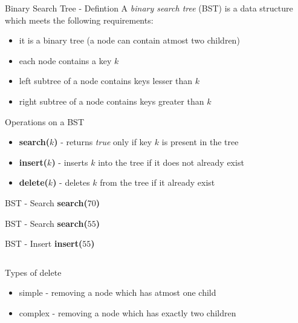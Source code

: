 \begin{frame}{Binary Search Tree - Defintion}
A \textit{binary search tree} (BST) is a data structure which meets the following requirements:
\begin{itemize}
\item it  is a binary tree (a node can contain atmost two children)
\item each node contains a key $k$
\item left subtree of a node contains keys lesser than $k$
\item right subtree of a node contains keys greater than $k$
\end{itemize}
\pause
Operations on a BST
\begin{itemize}
\item \textbf{search($k$)} - returns \textit{true} only if key $k$ is present in the tree
\item \textbf{insert($k$)} - inserts $k$ into the tree if it does not already exist
\item \textbf{delete($k$)} - deletes $k$ from the tree if it already exist
\end{itemize}
\end{frame}

\begin{frame}{BST - Search}
\textbf{search($70$)}\\

\end{frame}

\begin{frame}{BST - Search}
\textbf{search($55$)}\\

\end{frame}

\begin{frame}{BST - Insert}
\textbf{insert($55$)}\\
\begin{columns}
\begin{column}[t]{0.48\textwidth}

\end{column}
\pause
\pause
\begin{column}[t]{0.5\textwidth}

\end{column}
\end{columns}
\end{frame}

\begin{frame}{Types of delete}
\begin{itemize}
\item simple - removing a node which has atmost one child
\item complex - removing a node which has exactly two children
\end{itemize}
\end{frame}


